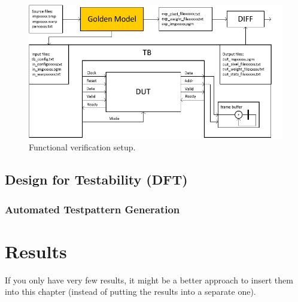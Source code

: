 \begin{figure}[tb]
  \centering
  \includegraphics[width=\linewidth]{./figures/tb}
  \caption{Functional verification setup.}
  \label{fig:func_ver}
\end{figure}

\subsection{Design for Testability (DFT)}
\subsubsection{Automated Testpattern Generation}

\section{Results}
If you only have very few results, it might be a better approach to
insert them into this chapter (instead of putting the results into a
separate one).
